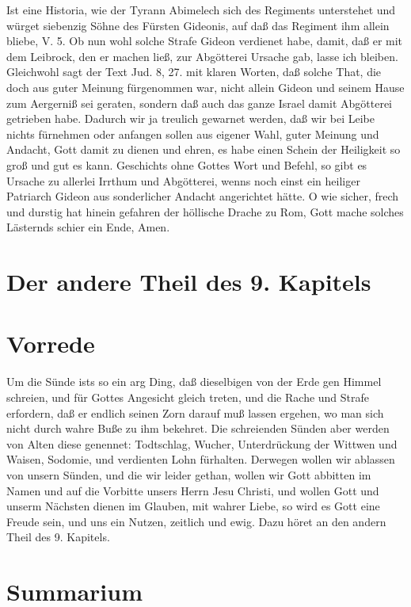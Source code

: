 Ist eine Historia, wie der Tyrann Abimelech sich des Regiments unterstehet und würget siebenzig Söhne des Fürsten Gideonis, auf daß das Regiment ihm allein bliebe, V. 5. Ob nun wohl solche Strafe Gideon verdienet habe, damit, daß er mit dem Leibrock, den er machen ließ, zur Abgötterei Ursache gab, lasse ich bleiben. Gleichwohl sagt der Text Jud. 8, 27. mit klaren Worten, daß solche That, die doch aus guter Meinung fürgenommen war, nicht allein Gideon und seinem Hause zum Aergerniß sei geraten, sondern daß auch das ganze Israel damit Abgötterei getrieben habe. Dadurch wir ja treulich gewarnet werden, daß wir bei Leibe nichts fürnehmen oder anfangen sollen aus eigener Wahl, guter Meinung und Andacht, Gott damit zu dienen und ehren, es habe einen Schein der Heiligkeit so groß und gut es kann. Geschichts ohne Gottes Wort und Befehl, so gibt es Ursache zu allerlei Irrthum und Abgötterei, wenns noch einst ein heiliger Patriarch Gideon aus sonderlicher Andacht angerichtet hätte. O wie sicher, frech und durstig hat hinein gefahren der höllische Drache zu Rom, Gott mache solches Lästernds schier ein Ende, Amen.

\section{Der andere Theil des 9. Kapitels}

\section{Vorrede}

Um die Sünde ists so ein arg Ding, daß dieselbigen von der Erde gen Himmel schreien, und für Gottes Angesicht gleich treten, und die Rache und Strafe erfordern, daß er endlich seinen Zorn darauf muß lassen ergehen, wo man sich nicht durch wahre Buße zu ihm bekehret. Die schreienden Sünden aber werden von Alten diese genennet: Todtschlag, Wucher, Unterdrückung der Wittwen und Waisen, Sodomie, und verdienten Lohn fürhalten. Derwegen wollen wir ablassen von unsern Sünden, und die wir leider gethan, wollen wir Gott abbitten im Namen und auf die Vorbitte unsers Herrn Jesu Christi, und wollen Gott und unserm Nächsten dienen im Glauben, mit wahrer Liebe, so wird es Gott eine Freude sein, und uns ein Nutzen, zeitlich und ewig. Dazu höret an den andern Theil des 9. Kapitels.
\section{Summarium}

